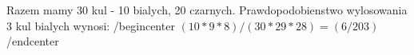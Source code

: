 Razem mamy 30 kul - 10 bialych, 20 czarnych.
Prawdopodobienstwo wylosowania 3 kul bialych wynosi:
/begin{center}
  $(10*9*8)/(30*29*28) = (6/203)$
/end{center}
